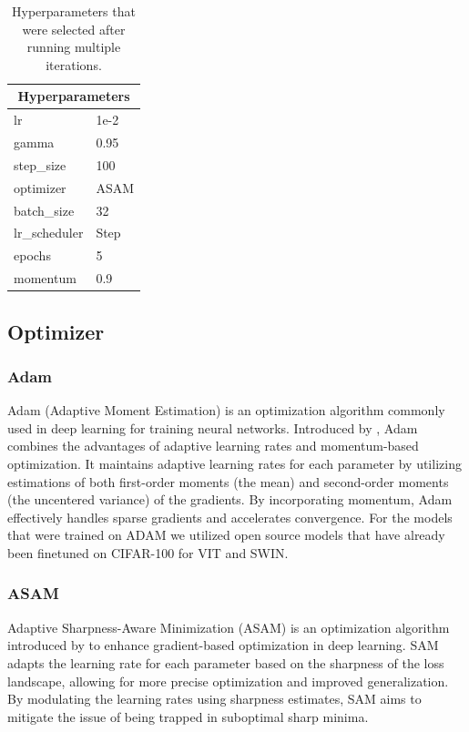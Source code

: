 \documentclass{article}
\begin{document}
\begin{table}[ht]
    \centering
    \begin{tabular}{|l|l|}
        \hline
        \multicolumn{2}{|c|}{\textbf{Hyperparameters}} \\ \hline
        lr            & 1e-2                           \\ \hline
        gamma         & 0.95                           \\ \hline
        step\_size    & 100                            \\ \hline
        optimizer     & ASAM                           \\ \hline
        batch\_size   & 32                             \\ \hline
        lr\_scheduler & Step                           \\ \hline
        epochs        & 5                              \\ \hline
        momentum      & 0.9
        \\ \hline
    \end{tabular}
    \caption{Hyperparameters that were selected after running multiple iterations.}
    \label{tab:actor_critic_hp}
\end{table}

\subsection{Optimizer}

\subsubsection{Adam}
Adam (Adaptive Moment Estimation) is an optimization algorithm commonly used in deep learning for training neural networks.
Introduced by \cite{Kingma2014AdamAM}, Adam combines the advantages of adaptive learning rates and momentum-based optimization.
It maintains adaptive learning rates for each parameter by utilizing estimations of both first-order moments (the mean) and second-order moments (the uncentered variance) of the gradients.
By incorporating momentum, Adam effectively handles sparse gradients and accelerates convergence.
For the models that were trained on ADAM we utilized open source models that have already been finetuned on CIFAR-100 for VIT and SWIN.

\subsubsection{ASAM}
Adaptive Sharpness-Aware Minimization (ASAM) is an optimization algorithm introduced by \cite{DBLP:journals/corr/abs-2102-11600} to enhance gradient-based optimization in deep learning.
SAM adapts the learning rate for each parameter based on the sharpness of the loss landscape, allowing for more precise optimization and improved generalization.
By modulating the learning rates using sharpness estimates, SAM aims to mitigate the issue of being trapped in suboptimal sharp minima.
\end{document}
